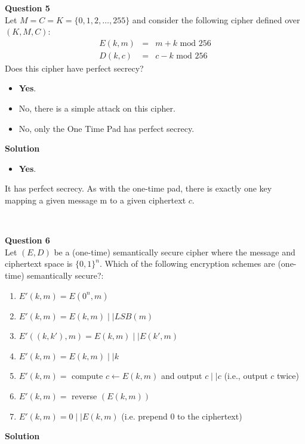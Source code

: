 \documentclass[a4paper,12pt]{article}
\begin{document}
\textbf{Question 5}\\

Let $M=C=K=\{0,1,2,…,255\}$ and consider the following cipher defined over $(K,M,C)$: 
%
\begin{eqnarray*}
E(k,m) & = & m+k \textrm{ mod }256\\
D(k,c) & = & c - k \textrm{ mod }256
\end{eqnarray*}
%
Does this cipher have perfect secrecy?
%
\begin{itemize}
%
\item \textbf{Yes}.
\item No, there is a simple attack on this cipher.
\item No, only the One Time Pad has perfect secrecy.
%
\end{itemize}

\textbf{Solution}
%
\begin{itemize}
%
\item \textbf{Yes}.
%
\end{itemize}
%
It has perfect secrecy. As with the one-time pad, there is exactly one key mapping a given message m to a given ciphertext $c$.

\ \newpage

\textbf{Question 6} \\

Let $(E,D)$ be a (one-time) semantically secure cipher where the message and ciphertext space is $\{0,1\}^{n}$. Which of the following encryption schemes are (one-time) semantically secure?:
%
\begin{enumerate}
%
\item $E'(k,m)=E(0^{n},m)$
\item $E'(k,m)=E(k,m)\mid \mid LSB(m)$
\item $E'((k,k'), m)=E(k,m)\mid \mid E(k',m)$
\item $E'(k,m)=E(k,m)\mid \mid k$
\item $E'(k,m)=$ compute $c\leftarrow E(k,m)$ and output  $c\mid \mid c$ (i.e., output $c$ twice)
\item $E'(k,m)=$ reverse $(E(k,m))$
\item $E'(k,m)=0 \mid \mid E(k,m)$ (i.e. prepend 0 to the ciphertext)
%
\end{enumerate}

\textbf{Solution}\\
\end{document}
